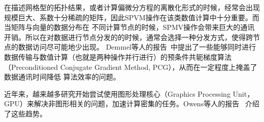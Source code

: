 在描述网格型的拓扑结果，或者计算偏微分方程的离散化形式的时候，经常会出现规模巨大、系数十分稀疏的矩阵，因此SPVM操作在该类数值计算中十分重要。而当矩阵与向量的数据分布在
不同计算节点的时候，SPMV操作会带来巨大的通讯开销。所以在对数据进行节点分发的的时候，通常会选择一种分发方式，使得跨节点的数据访问尽可能地少出现。
Demmel等人的报告~\cite{demmel1993parallel}中提出了一些能够同时进行数据传输与数值计算（也就是两种操作并行进行）的预条件共轭梯度算法（Preconditioned Conjugate Gradient Method, PCG），从而在一定程度上掩盖了数据通讯时间降低
算法效率的问题。

近年来，越来越多研究开始尝试使用图形处理核心（Graphics Processing Unit，GPU）来解决非图形相关的问题，加速计算密集的任务。Owens等人的报告~\cite{owens2007survey}
介绍了这些趋势。
